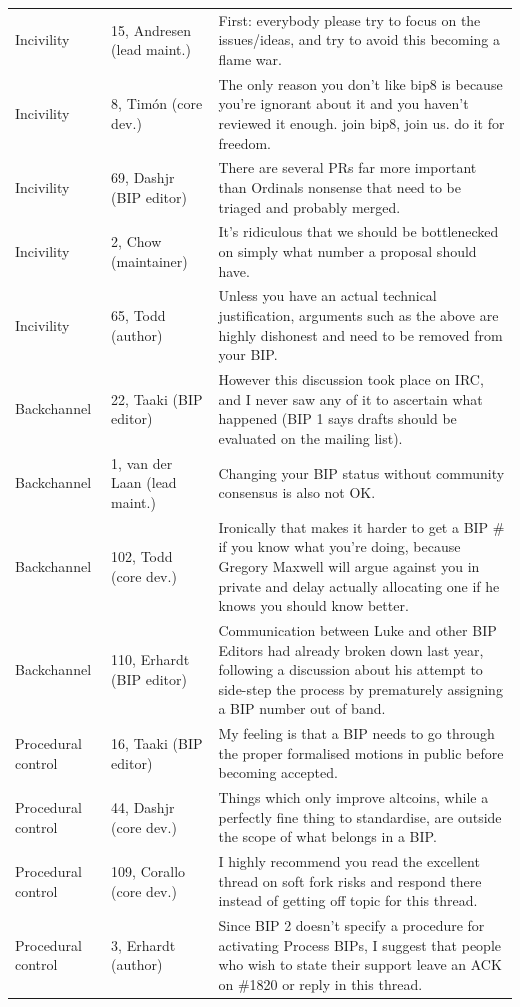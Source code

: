 \begin{table}[t]
\begin{tabular}{p{}p{}p{}}
Incivility & 15, Andresen (lead maint.) & First: everybody please try to focus on the issues/ideas, and try to avoid this becoming a flame war. \\
Incivility & 8, Tim\'on (core dev.) & The only reason you don't like bip8 is because you're ignorant about it and you haven't reviewed it enough. join bip8, join us. do it for freedom. \\
Incivility & 69, Dashjr (BIP editor) & There are several PRs far more important than Ordinals nonsense that need to be triaged and probably merged. \\
Incivility & 2, Chow (maintainer) & It's ridiculous that we should be bottlenecked on simply what number a proposal should have. \\
Incivility & 65, Todd (author) & Unless you have an actual technical justification, arguments such as the above are highly dishonest and need to be removed from your BIP. \\
Backchannel & 22, Taaki (BIP editor) & However this discussion took place on IRC, and I never saw any of it to ascertain what happened (BIP 1 says drafts should be evaluated on the mailing list). \\
Backchannel & 1, van der Laan (lead maint.) & Changing your BIP status without community consensus is also not OK. \\
Backchannel & 102, Todd (core dev.) & Ironically that makes it harder to get a BIP \# if you know what you're doing, because Gregory Maxwell will argue against you in private and delay actually allocating one if he knows you should know better. \\
Backchannel & 110, Erhardt (BIP editor) & Communication between Luke and other BIP Editors had already broken down last year, following a discussion about his attempt to side-step the process by prematurely assigning a BIP number out of band. \\
Procedural control & 16, Taaki (BIP editor) & My feeling is that a BIP needs to go through the proper formalised motions in public before becoming accepted. \\
Procedural control & 44, Dashjr (core dev.) & Things which only improve altcoins, while a perfectly fine thing to standardise, are outside the scope of what belongs in a BIP. \\
Procedural control & 109, Corallo (core dev.) & I highly recommend you read the excellent thread on soft fork risks and respond there instead of getting off topic for this thread. \\
Procedural control & 3, Erhardt (author) & Since BIP 2 doesn't specify a procedure for activating Process BIPs, I suggest that people who wish to state their support leave an ACK on \#1820 or reply in this thread. \\
\bottomrule
\end{tabular}
\end{table}

